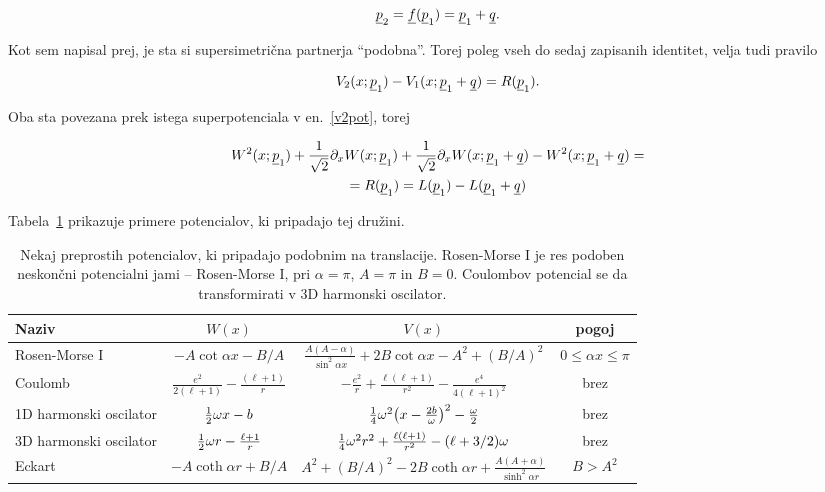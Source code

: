 \[
	\underline{p}_2 = \underline{f}(\underline{p}_1) = \underline{p}_1 + \underline{q}.
\]

Kot sem napisal prej, je sta si supersimetri\v cna partnerja "`podobna"'. Torej poleg vseh do sedaj zapisanih
identitet, velja tudi pravilo

\begin{equation}
	V_2 (x; \underline{p}_1) - V_1 (x; \underline{p}_1 + \underline{q}) = R (\underline{p}_1).
\end{equation}

\ni Oba sta povezana prek istega superpotenciala v en.~\eqref{v2pot}, torej

\begin{multline}
	W^2 (x; \underline{p}_1) + \frac{1}{\sqrt{2}}\partial_x W(x; \underline{p}_1) + \frac{1}{\sqrt{2}}\partial_x W (x; \underline{p}_1 + \underline{q}) - W^2
		(x; \underline{p}_1 + \underline{q}) =\\= R (\underline{p}_1) = L (\underline{p}_1) - L (\underline{p}_1 + \underline{q})
\end{multline}

\ni Tabela~\ref{tab1} prikazuje primere potencialov, ki pripadajo tej dru\v zini.

\begin{table}[H]\centering
	\caption{Nekaj preprostih potencialov, ki pripadajo podobnim na translacije. Rosen-Morse I je res podoben
		neskon\v cni potencialni jami -- Rosen-Morse I, pri $\alpha = \pi$, $A = \pi$ in $B = 0$. Coulombov
		potencial se da transformirati v 3D harmonski oscilator.}
	\label{tab1}
	\vspace{0.2cm}
	\begin{tabular}{l || c | c | c}
		Naziv & $W(x)$ & $V(x)$ & pogoj\\ \hline
		Rosen-Morse I & $-A \cot \alpha x - B/A$ & $\frac{A (A - \alpha)}{\sin^2 \alpha x} + 2B\cot\alpha x - A^2
			+ (B/A)^2$ & $0 \leq \alpha x \leq \pi$ \\
		Coulomb & $\frac{e^2}{2(\ell+1)} - \frac{(\ell+1)}{r}$ & $-\frac{e^2}{r} + \frac{\ell(\ell+1)}{r^2} -
			\frac{e^4}{4(\ell + 1)^2}$ & brez \\
		1D harmonski oscilator & $\frac{1}{2}\omega x - b$ & $\frac{1}{4}\omega^2\big(x - \frac{2b}{\omega}\big)^2 - \frac{\omega}{2}$
			& brez \\
		3D harmonski oscilator & $\frac{1}{2}\omega r - \frac{\ell + 1}{r}$ & $\frac{1}{4}\omega^2r^2 +
			\frac{\ell(\ell + 1)}{r^2} - (\ell + 3/2)\omega$ & brez \\
		Eckart & $-A\coth\alpha r + B/A$ & $A^2 + (B/A)^2 - 2B\coth\alpha r + \frac{A(A + \alpha)}{\sinh^2 \alpha r}$
			& $B > A^2$ \\
	\end{tabular}
\end{table}

